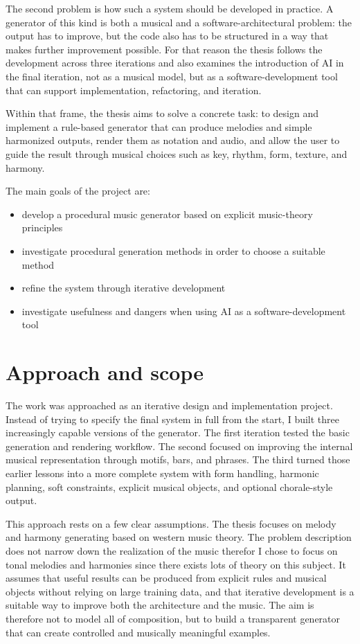 The second problem is how such a system should be developed in practice. A generator of this kind is both a musical and a software-architectural problem: the output has to improve, but the code also has to be structured in a way that makes further improvement possible. For that reason the thesis follows the development across three iterations and also examines the introduction of \ac{AI} in the final iteration, not as a musical model, but as a software-development tool that can support implementation, refactoring, and iteration.

Within that frame, the thesis aims to solve a concrete task: to design and implement a rule-based generator that can produce melodies and simple harmonized outputs, render them as notation and audio, and allow the user to guide the result through musical choices such as key, rhythm, form, texture, and harmony.

The main goals of the project are:
\begin{itemize}
  \item develop a procedural music generator based on explicit music-theory principles
\item investigate procedural generation methods in order to choose a suitable method 
  \item refine the system through iterative development 
  \item investigate usefulness and dangers when using \ac{AI} as a software-development tool
\end{itemize}

\section{Approach and scope}
The work was approached as an iterative design and implementation project. Instead of trying to specify the final system in full from the start, I built three increasingly capable versions of the generator. The first iteration tested the basic generation and rendering workflow. The second focused on improving the internal musical representation through motifs, bars, and phrases. The third turned those earlier lessons into a more complete system with form handling, harmonic planning, soft constraints, explicit musical objects, and optional chorale-style output.

This approach rests on a few clear assumptions. The thesis focuses on melody and harmony generating based on western music theory. The problem description does not narrow down the realization of the music therefor I chose to focus on tonal melodies and harmonies since there exists lots of theory on this subject. It assumes that useful results can be produced from explicit rules and musical objects without relying on large training data, and that iterative development is a suitable way to improve both the architecture and the music. The aim is therefore not to model all of composition, but to build a transparent generator that can create controlled and musically meaningful examples.

